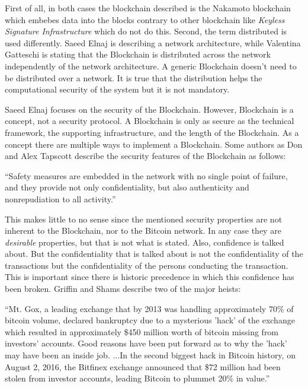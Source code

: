 \documentclass[..]{subfiles}
\begin{document}
First of all, in both cases the blockchain described is the Nakamoto blockchain which embebes data into the blocks contrary to other blockchain like \textit{Keyless Signature Infrastructure} which do not do this. Second, the term distributed is used differently. Saeed Elnaj is describing a network architecture, while Valentina Gatteschi is stating that the Blockchain is distributed across the network independently of the network architecture. A generic Blockchain doesn't need to be distributed over a network. It is true that the distribution helps the computational security of the system but it is not mandatory. 

Saeed Elnaj focuses on the security of the Blockchain. However, Blockchain is a concept, not a security protocol. A Blockchain is only as secure as the technical framework, the supporting infrastructure, and the length of the Blockchain. As a concept there are multiple ways to implement a Blockchain. Some authors as Don and Alex Tapscott describe the security features of the Blockchain as follows:
\begin{displayquote}
	``Safety measures are embedded in the network with no single point of failure, and they provide not only confidentiality, but also authenticity and nonrepudiation to all activity.''\cite{radziwill2018blockchain}
\end{displayquote}

This makes little to no sense since the mentioned security properties are not inherent to the Blockchain, nor to the Bitcoin network. In any case they are \textit{desirable} properties, but that is not what is stated. Also, confidence is talked about. But the confidentiality that is talked about is not the confidentiality of the transactions but the confidentiality of the persons conducting the transaction. This is important since there is historic precedence in which this confidence has been broken. Griffin and Shams describe two of the major heists:
\begin{displayquote}
	``Mt. Gox, a leading exchange that by 2013 was handling approximately 70\% of bitcoin volume, declared bankruptcy due to a mysterious ’hack’ of the exchange which resulted in approximately \$450 million worth of bitcoin missing from investors’ accounts. Good reasons have been put forward as to why the ’hack’ may have been an inside job. ...In the second biggest hack in Bitcoin history, on August 2, 2016, the Bitfinex exchange announced that \$72 million had been stolen from investor accounts, leading Bitcoin to plummet 20\% in value.''\cite{griffin}
\end{displayquote}
\end{document}
